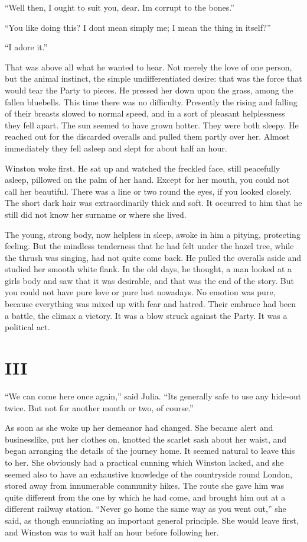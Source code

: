 ``Well then, I ought to suit you, dear. I\textquotesingle m corrupt to
the bones.''

``You like doing this? I don\textquotesingle t mean simply me; I mean the
thing in itself?''

``I adore it.''

That was above all what he wanted to hear. Not merely the love of one
person, but the animal instinct, the simple undifferentiated desire:
that was the force that would tear the Party to pieces. He pressed her
down upon the grass, among the fallen bluebells. This time there was no
difficulty. Presently the rising and falling of their breasts slowed to
normal speed, and in a sort of pleasant helplessness they fell apart.
The sun seemed to have grown hotter. They were both sleepy. He reached
out for the discarded overalls and pulled them partly over her. Almost
immediately they fell asleep and slept for about half an hour.

Winston woke first. He sat up and watched the freckled face, still
peacefully asleep, pillowed on the palm of her hand. Except for her
mouth, you could not call her beautiful. There was a line or two round
the eyes, if you looked closely. The short dark hair was extraordinarily
thick and soft. It occurred to him that he still did not know her
surname or where she lived.

The young, strong body, now helpless in sleep, awoke in him a pitying,
protecting feeling. But the mindless tenderness that he had felt under
the hazel tree, while the thrush was singing, had not quite come back.
He pulled the overalls aside and studied her smooth white flank. In the
old days, he thought, a man looked at a girl\textquotesingle s body and
saw that it was desirable, and that was the end of the story. But you
could not have pure love or pure lust nowadays. No emotion was pure,
because everything was mixed up with fear and hatred. Their embrace had
been a battle, the climax a victory. It was a blow struck against the
Party. It was a political act.


\section{III}\label{iii-1}

``We can come here once again,'' said Julia. ``It\textquotesingle s
generally safe to use any hide-out twice. But not for another month or
two, of course.''

As soon as she woke up her demeanor had changed. She became alert and
businesslike, put her clothes on, knotted the scarlet sash about her
waist, and began arranging the details of the journey home. It seemed
natural to leave this to her. She obviously had a practical cunning
which Winston lacked, and she seemed also to have an exhaustive
knowledge of the countryside round London, stored away from innumerable
community hikes. The route she gave him was quite different from the one
by which he had come, and brought him out at a different railway
station. ``Never go home the same way as you went out,'' she said, as
though enunciating an important general principle. She would leave
first, and Winston was to wait half an hour before following her.

